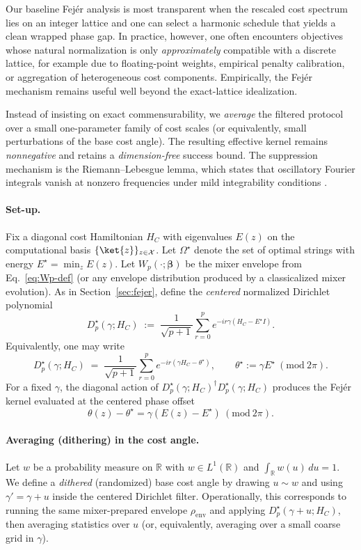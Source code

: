 \documentclass[a4paper,unpublished,onecolumn,11pt]{quantumarticle}
\theoremstyle{definition}
\theoremstyle{remark}
\begin{document}
Our baseline Fej\'er analysis is most transparent when the rescaled cost spectrum
lies on an integer lattice and one can select a harmonic schedule that yields a
clean wrapped phase gap. In practice, however, one often encounters objectives
whose natural normalization is only \emph{approximately} compatible with a
discrete lattice, for example due to floating-point weights, empirical penalty calibration, or aggregation of heterogeneous cost components. Empirically, the Fej\'er mechanism remains useful well beyond the exact-lattice idealization.

Instead of insisting on exact commensurability, we
\emph{average} the filtered protocol over a small one-parameter family of cost
scales (or equivalently, small perturbations of the base cost angle). The
resulting effective kernel remains \emph{nonnegative} and retains a
\emph{dimension-free} success bound. The suppression mechanism is the
Riemann--Lebesgue lemma, which states that oscillatory Fourier integrals vanish
at nonzero frequencies under mild integrability conditions
\cite{SteinShakarchi2003Fourier,Katznelson2004}.

\paragraph{Set-up.}
Fix a diagonal cost Hamiltonian $H_C$ with eigenvalues $E(z)$ on the computational
basis $\{\ket{z}\}_{z\in\mathcal X}$. Let $\Omega^\star$ denote the set of optimal
strings with energy $E^\star=\min_z E(z)$.
Let $W_p(\cdot;\boldsymbol\beta)$ be the mixer envelope from
Eq.~\eqref{eq:Wp-def} (or any envelope distribution produced by a classicalized
mixer evolution). As in Section~\ref{sec:fejer}, define the \emph{centered} normalized Dirichlet polynomial
\[
D_p^\star(\gamma;H_C)
\;:=\;
\frac{1}{\sqrt{p+1}}
\sum_{r=0}^{p} e^{-i r \gamma (H_C-E^\star I)}.
\]
Equivalently, one may write
\[
D_p^\star(\gamma;H_C)
\;=\;
\frac{1}{\sqrt{p+1}}
\sum_{r=0}^{p} e^{-ir(\gamma H_C-\theta^\star)},
\qquad
\theta^\star:=\gamma E^\star \ (\mathrm{mod}\ 2\pi).
\]
For a fixed $\gamma$, the diagonal action of
$D_p^\star(\gamma;H_C)^\dagger D_p^\star(\gamma;H_C)$
produces the Fej\'er kernel evaluated at the centered phase offset
\[
\theta(z)-\theta^\star
=
\gamma(E(z)-E^\star)\ (\mathrm{mod}\ 2\pi).
\]





\paragraph{Averaging (dithering) in the cost angle.}
Let $w$ be a probability measure on $\mathbb R$ with $w\in L^1(\mathbb R)$ and
$\int_\mathbb R w(u)\,du=1$. We define a \emph{dithered} (randomized) base cost
angle by drawing $u\sim w$ and using $\gamma'=\gamma+u$ inside the centered Dirichlet filter.
Operationally, this corresponds to running the same mixer-prepared envelope
$\rho_{\mathrm{env}}$ and applying $D_p^\star(\gamma+u;H_C)$, then averaging statistics
over $u$ (or, equivalently, averaging over a small coarse grid in $\gamma$).
\end{document}

